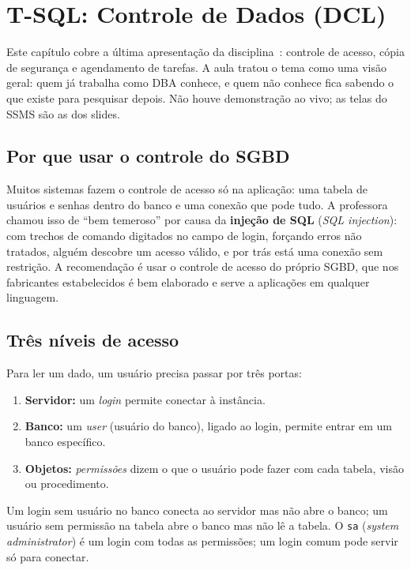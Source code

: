 \setchapterpreamble[u]{\margintoc}
\chapter{T-SQL: Controle de Dados (DCL)}

Este capítulo cobre a última apresentação da
disciplina~\cite{BaiocoCET615}: controle de acesso, cópia de
segurança e agendamento de tarefas. A aula tratou o tema como uma visão
geral: quem já trabalha como DBA conhece, e quem não conhece fica sabendo
o que existe para pesquisar depois. Não houve demonstração ao vivo; as
telas do SSMS são as dos slides.

\section{Por que usar o controle do SGBD}

Muitos sistemas fazem o controle de acesso só na aplicação: uma tabela
de usuários e senhas dentro do banco e uma conexão que pode tudo. A
professora chamou isso de ``bem temeroso'' por causa da \textbf{injeção
de SQL} (\emph{SQL injection}): com trechos de
comando digitados no campo de login, forçando erros não tratados,
alguém descobre um acesso válido, e por trás está uma conexão sem
restrição. A recomendação é usar o controle de acesso do próprio SGBD,
que nos fabricantes estabelecidos é bem elaborado e serve a aplicações em
qualquer linguagem.

\section{Três níveis de acesso}

Para ler um dado, um usuário precisa passar por três portas:

\begin{enumerate}
	\item \textbf{Servidor:} um \emph{login} permite conectar à instância.
	\item \textbf{Banco:} um \emph{user} (usuário do banco), ligado ao
	login, permite entrar em um banco específico.
	\item \textbf{Objetos:} \emph{permissões} dizem o que o usuário pode
	fazer com cada tabela, visão ou procedimento.
\end{enumerate}

Um login sem usuário no banco conecta ao servidor mas não abre o banco;
um usuário sem permissão na tabela abre o banco mas não lê a tabela. O
\texttt{sa} (\emph{system administrator}) é um login com todas as
permissões; um login comum pode servir só para conectar.

